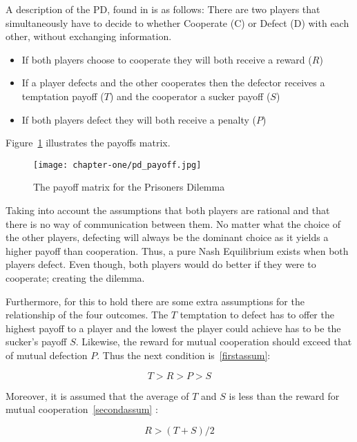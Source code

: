 A description of the PD, found in \cite{Li2011} is as follows:
There are two players that simultaneously have to decide to whether Cooperate (C)
or Defect (D) with each other, without exchanging information.

\begin{itemize}
  \item If both players choose to cooperate they will both receive a reward (\(R\))
  \item If a player defects and the other cooperates then the defector receives
  a temptation payoff (\(T\)) and the cooperator a sucker payoff (\(S\))
  \item If both players defect they will both receive a penalty (\(P\))
\end{itemize}

Figure~\ref{fig:pd_payoff} illustrates the payoffs matrix.

\begin{figure}[h!]
    \centering
    \texttt{[image: chapter-one/pd\_payoff.jpg]}
    \caption{The payoff matrix for the Prisoners Dilemma}
    \label{fig:pd_payoff}
\end{figure}

Taking into account the assumptions that both players are rational
and that there is no way of communication between them. No matter what the choice
of the other players,  defecting will always be the dominant choice as it yields
a higher payoff than cooperation.
Thus, a pure Nash Equilibrium exists when both players defect. Even though, both
players would do better if they were to cooperate; creating the dilemma.

Furthermore, for this to hold there are some extra assumptions for the
relationship of the four outcomes. The \(T\) temptation to defect has to offer the
highest payoff to a player and the lowest the player could achieve has to be the sucker's
payoff \(S\).
Likewise, the reward for mutual cooperation should exceed that of mutual
defection \(P\). Thus the next condition is~\ref{firstassum}:

\begin{equation}\label{firstassum}
 T > R > P > S
\end{equation}

Moreover, it is assumed that the average of \(T\) and \(S\) is less than the reward for
mutual cooperation~\ref{secondassum} :

\begin{equation}\label{secondassum}
    R > (T+S)/2
\end{equation}

